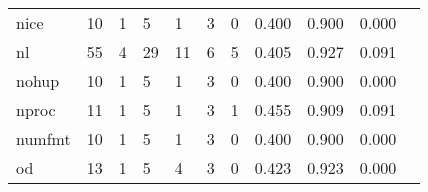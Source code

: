 \begin{longtable}{lp{1.2cm}p{1.2cm}p{1.2cm}p{1.2cm}p{1.2cm}p{1.2cm}p{1.2cm}p{1.2cm}p{1.2cm}p{1.2cm}}
nice      &                                    10 &                                                  1 &                                                  5 &                                                  1 &                                                  3 &                                                  0 &                                         0.400 &                                              0.900 &                                              0.000 \\
nl        &                                    55 &                                                  4 &                                                 29 &                                                 11 &                                                  6 &                                                  5 &                                         0.405 &                                              0.927 &                                              0.091 \\
nohup     &                                    10 &                                                  1 &                                                  5 &                                                  1 &                                                  3 &                                                  0 &                                         0.400 &                                              0.900 &                                              0.000 \\
nproc     &                                    11 &                                                  1 &                                                  5 &                                                  1 &                                                  3 &                                                  1 &                                         0.455 &                                              0.909 &                                              0.091 \\
numfmt    &                                    10 &                                                  1 &                                                  5 &                                                  1 &                                                  3 &                                                  0 &                                         0.400 &                                              0.900 &                                              0.000 \\
od        &                                    13 &                                                  1 &                                                  5 &                                                  4 &                                                  3 &                                                  0 &                                         0.423 &                                              0.923 &                                              0.000 \\

\end{longtable}
